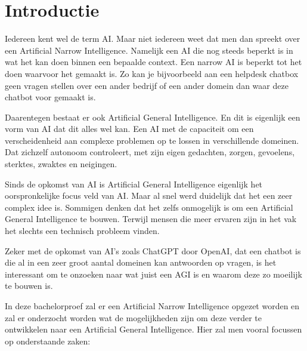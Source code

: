 
\section{Introductie} %
\label{sec:introductie}

Iedereen kent wel de term AI. Maar niet iedereen weet dat men dan spreekt over een Artificial Narrow Intelligence. Namelijk een AI die nog steeds beperkt is in wat het kan doen binnen een bepaalde context. Een narrow AI is beperkt tot het doen waarvoor het gemaakt is. Zo kan je bijvoorbeeld aan een helpdesk chatbox geen vragen stellen over een ander bedrijf of een ander domein dan waar deze chatbot voor gemaakt is. \linebreak

Daarentegen bestaat er ook Artificial General Intelligence. En dit is eigenlijk een vorm van AI dat dit alles wel kan. Een AI met de capaciteit om een verscheidenheid aan complexe problemen op te lossen in verschillende domeinen. Dat zichzelf autonoom controleert, met zijn eigen gedachten, zorgen, gevoelens, sterktes, zwaktes en neigingen. \linebreak

Sinds de opkomst van AI is Artificial General Intelligence eigenlijk het oorspronkelijke focus veld van AI. Maar al snel werd duidelijk dat het een zeer complex idee is. Sommigen denken dat het zelfs onmogelijk is om een Artificial General Intelligence te bouwen. Terwijl mensen die meer ervaren zijn in het vak het slechts een technisch probleem vinden. \linebreak

Zeker met de opkomst van AI's zoals ChatGPT door OpenAI, dat een chatbot is die al in een zeer groot aantal domeinen kan antwoorden op vragen, is het interessant om te onzoeken naar wat juist een AGI is en waarom deze zo moeilijk te bouwen is. \linebreak

In deze bachelorproef zal er een Artificial Narrow Intelligence opgezet worden en zal er onderzocht worden wat de mogelijkheden zijn om deze verder te ontwikkelen naar een Artificial General Intelligence. Hier zal men vooral focussen op onderstaande zaken: \linebreak


